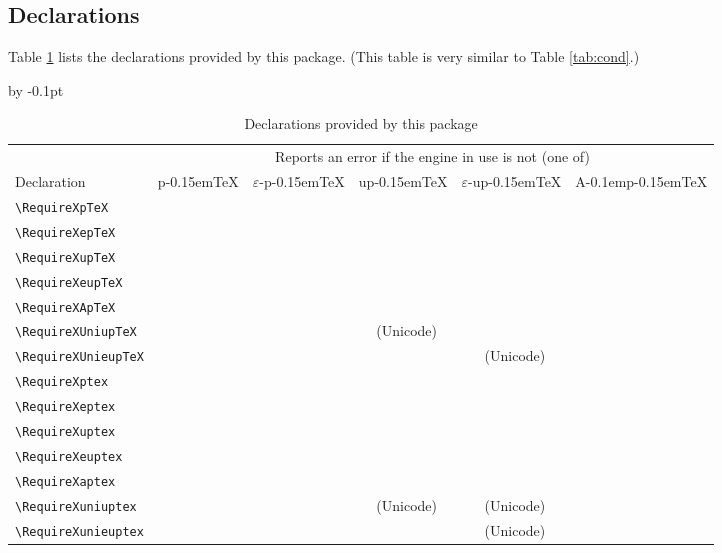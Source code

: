 \documentclass[a4paper]{article}
\newcommand\pTeX{p\kern-0.15em\TeX}
\newcommand\e{\ensuremath{\varepsilon}}
\newcommand\epTeX{\e-\pTeX}
\newcommand\upTeX{u\pTeX}
\newcommand\eupTeX{\e-\upTeX}
\newcommand\ApTeX{A\kern-0.1em\pTeX}
\newcommand\yes{\checkmark}
\newcommand\UNI{(Unicode)}
\newcommand\uni{{\footnotesize\UNI}}
\begin{document}
\subsection{Declarations}

Table \ref{tab:decl} lists the declarations provided by this package. (This
table is very similar to Table \ref{tab:cond}.)
\vskip-10pt\relax
\begin{table}[ht]\centering\advance\tabcolsep by -0.1pt\relax
\caption{Declarations provided by this package}
\label{tab:decl}
\medskip
\begin{tabular}{lccccc}
\toprule
                          & \multicolumn{5}{c}{Reports an error if the engine in
                              use is not (one of)}                            \\
                            \cmidrule(lr){2-6}
Declaration               & \pTeX & \epTeX & \upTeX     & \eupTeX    & \ApTeX \\
\midrule
\verb|\RequireXpTeX|      & \yes  &        &            &            &        \\
\verb|\RequireXepTeX|     &       & \yes   &            &            &        \\
\verb|\RequireXupTeX|     &       &        & \yes       &            &        \\
\verb|\RequireXeupTeX|    &       &        &            & \yes       &        \\
\verb|\RequireXApTeX|     &       &        &            &            & \yes   \\
\verb|\RequireXUniupTeX|  &       &        & \yes\ \uni &            &        \\
\verb|\RequireXUnieupTeX| &       &        &            & \yes\ \uni &        \\
\verb|\RequireXptex|      & \yes  & \yes   & \yes       & \yes       & \yes   \\
\verb|\RequireXeptex|     &       & \yes   &            & \yes       &        \\
\verb|\RequireXuptex|     &       &        & \yes       & \yes       & \yes   \\
\verb|\RequireXeuptex|    &       &        &            & \yes       &        \\
\verb|\RequireXaptex|     &       &        &            &            & \yes   \\
\verb|\RequireXuniuptex|  &       &        & \yes\ \uni & \yes\ \uni & \yes   \\
\verb|\RequireXunieuptex| &       &        &            & \yes\ \uni &        \\
\bottomrule
\end{tabular}
\end{table}
\end{document}
